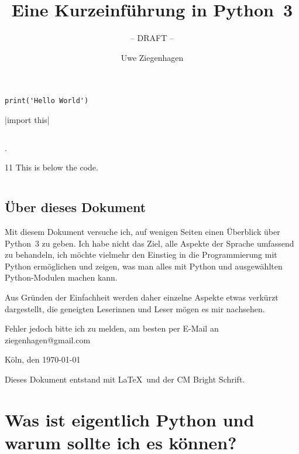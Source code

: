 \documentclass[12pt,ngerman]{scrreprt}
\title{Eine Kurzeinführung in Python~3}
\subtitle{-- DRAFT --}
\author{Uwe Ziegenhagen}
\begin{document}
\maketitle

\tableofcontents

\listoffigures

\listoftables

\listoflistings

\clearpage


\begin{verbatim}
print('Hello World')
\end{verbatim}

|import this|


\inputminted[bgcolor=bg]{python}{Codes/hello_world.py}.

    \begin{listing}[H]
        \caption{11 This is below the code.}
        \inputminted{python}{Codes/hello_world.py}
        \label{lst:the-code}
    \end{listing}


\section*{Über dieses Dokument}

Mit diesem Dokument versuche ich, auf wenigen Seiten einen Überblick über Python~3 zu geben. Ich habe nicht das Ziel, alle Aspekte der Sprache umfassend zu behandeln, ich möchte vielmehr den Einstieg in die Programmierung mit Python ermöglichen und zeigen, was man alles mit Python und ausgewählten Python-Modulen machen kann. 

Aus Gründen der Einfachheit werden daher einzelne Aspekte etwas verkürzt dargestellt, die geneigten Leserinnen und Leser mögen es mir nachsehen. 

Fehler jedoch bitte ich zu melden, am besten per E-Mail an ziegenhagen@gmail.com


\vspace*{3em}Köln, den \today

\vfill Dieses Dokument entstand mit \LaTeX\ und der CM Bright Schrift.

\chapter{Was ist eigentlich Python und warum sollte ich es können?}
\end{document}
